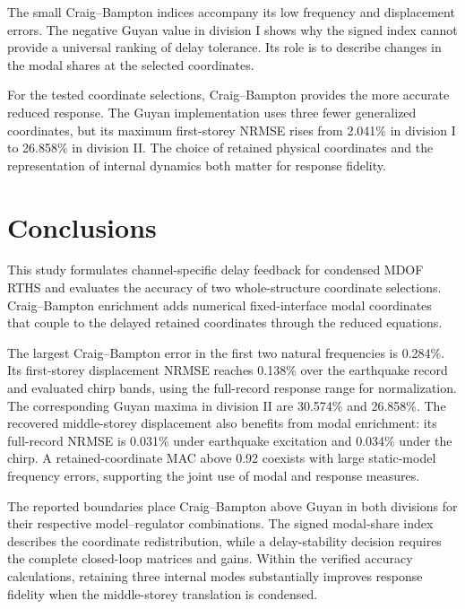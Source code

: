 \documentclass[a4paper,fleqn,review,12pt]{cas-sc}
\numberwithin{equation}{section}
\newcommand{\rev}[1]{{\color{red}#1}}
\begin{document}
\rev{The small Craig--Bampton indices accompany its low frequency and displacement errors. The negative Guyan value in division I shows why the signed index cannot provide a universal ranking of delay tolerance. Its role is to describe changes in the modal shares at the selected coordinates.

For the tested coordinate selections, Craig--Bampton provides the more accurate reduced response. The Guyan implementation uses three fewer generalized coordinates, but its maximum first-storey NRMSE rises from 2.041\% in division I to 26.858\% in division II. The choice of retained physical coordinates and the representation of internal dynamics both matter for response fidelity.}



\section{Conclusions} \label{sec6}

\rev{This study formulates channel-specific delay feedback for condensed MDOF RTHS and evaluates the accuracy of two whole-structure coordinate selections. Craig--Bampton enrichment adds numerical fixed-interface modal coordinates that couple to the delayed retained coordinates through the reduced equations.

The largest Craig--Bampton error in the first two natural frequencies is 0.284\%. Its first-storey displacement NRMSE reaches 0.138\% over the earthquake record and evaluated chirp bands, using the full-record response range for normalization. The corresponding Guyan maxima in division II are 30.574\% and 26.858\%. The recovered middle-storey displacement also benefits from modal enrichment: its full-record NRMSE is 0.031\% under earthquake excitation and 0.034\% under the chirp. A retained-coordinate MAC above 0.92 coexists with large static-model frequency errors, supporting the joint use of modal and response measures.

The reported boundaries place Craig--Bampton above Guyan in both divisions for their respective model--regulator combinations. The signed modal-share index describes the coordinate redistribution, while a delay-stability decision requires the complete closed-loop matrices and gains. Within the verified accuracy calculations, retaining three internal modes substantially improves response fidelity when the middle-storey translation is condensed.}





\end{document}
